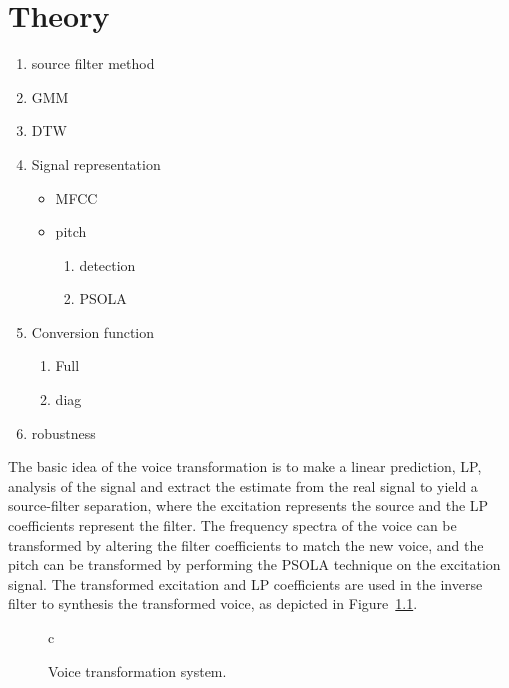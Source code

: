 \chapter{Theory} %
\label{cha:theory}
\begin{enumerate}
	\item source filter method
	\item GMM
	\item DTW
	\item Signal representation
	\begin{itemize}
		\item MFCC
		\item pitch
		\begin{enumerate}
			\item detection
			\item PSOLA
		\end{enumerate}
	\end{itemize}
	\item Conversion function
	\begin{enumerate}
		\item Full
		\item diag
	\end{enumerate}
	\item robustness
\end{enumerate}

The basic idea of the voice transformation is to make a linear prediction, LP, analysis of the signal and extract the estimate from the real signal to yield a source-filter separation, where the excitation represents the source and the LP coefficients represent the filter. The frequency spectra of the voice can be transformed by altering the filter coefficients to match the new voice, and the pitch can be transformed by performing the PSOLA technique on the excitation signal. The transformed excitation and LP coefficients are used in the inverse filter to synthesis the transformed voice, as depicted in Figure~\ref{fig:VC}.
\begin{figure}[htbp]
  \begin{center}
  \begin{tabular}[h]{c}
  \end{tabular}
  \caption{Voice transformation system.}
  \label{fig:VC}
  \end{center}
\end{figure}

